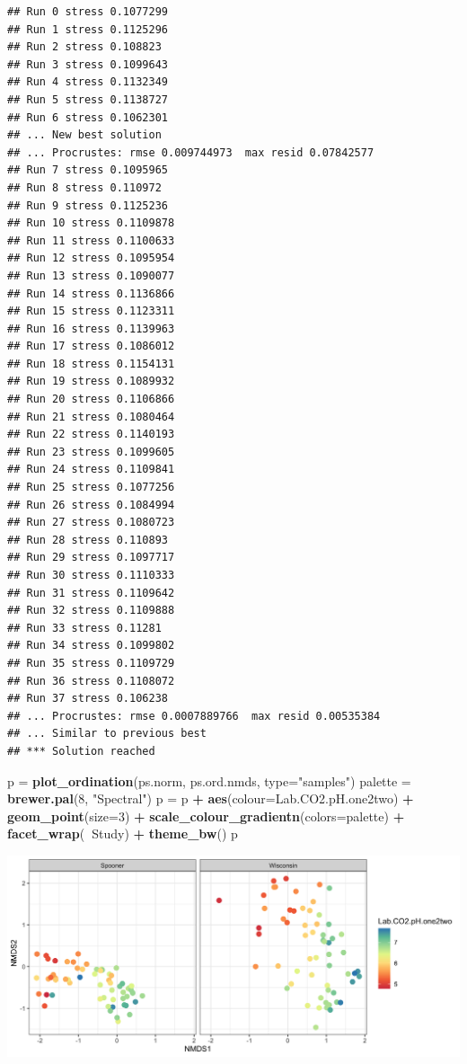 \documentclass[]{article}
\newenvironment{Shaded}{\begin{snugshade}}{\end{snugshade}}
\newcommand{\DataTypeTok}[1]{\textcolor[rgb]{0.13,0.29,0.53}{#1}}
\newcommand{\DecValTok}[1]{\textcolor[rgb]{0.00,0.00,0.81}{#1}}
\newcommand{\KeywordTok}[1]{\textcolor[rgb]{0.13,0.29,0.53}{\textbf{#1}}}
\newcommand{\NormalTok}[1]{#1}
\newcommand{\OperatorTok}[1]{\textcolor[rgb]{0.81,0.36,0.00}{\textbf{#1}}}
\newcommand{\StringTok}[1]{\textcolor[rgb]{0.31,0.60,0.02}{#1}}
\begin{document}
\begin{verbatim}
## Run 0 stress 0.1077299 
## Run 1 stress 0.1125296 
## Run 2 stress 0.108823 
## Run 3 stress 0.1099643 
## Run 4 stress 0.1132349 
## Run 5 stress 0.1138727 
## Run 6 stress 0.1062301 
## ... New best solution
## ... Procrustes: rmse 0.009744973  max resid 0.07842577 
## Run 7 stress 0.1095965 
## Run 8 stress 0.110972 
## Run 9 stress 0.1125236 
## Run 10 stress 0.1109878 
## Run 11 stress 0.1100633 
## Run 12 stress 0.1095954 
## Run 13 stress 0.1090077 
## Run 14 stress 0.1136866 
## Run 15 stress 0.1123311 
## Run 16 stress 0.1139963 
## Run 17 stress 0.1086012 
## Run 18 stress 0.1154131 
## Run 19 stress 0.1089932 
## Run 20 stress 0.1106866 
## Run 21 stress 0.1080464 
## Run 22 stress 0.1140193 
## Run 23 stress 0.1099605 
## Run 24 stress 0.1109841 
## Run 25 stress 0.1077256 
## Run 26 stress 0.1084994 
## Run 27 stress 0.1080723 
## Run 28 stress 0.110893 
## Run 29 stress 0.1097717 
## Run 30 stress 0.1110333 
## Run 31 stress 0.1109642 
## Run 32 stress 0.1109888 
## Run 33 stress 0.11281 
## Run 34 stress 0.1099802 
## Run 35 stress 0.1109729 
## Run 36 stress 0.1108072 
## Run 37 stress 0.106238 
## ... Procrustes: rmse 0.0007889766  max resid 0.00535384 
## ... Similar to previous best
## *** Solution reached
\end{verbatim}

\begin{Shaded}
\begin{Highlighting}[]
\NormalTok{p =}\StringTok{ }\KeywordTok{plot_ordination}\NormalTok{(ps.norm, ps.ord.nmds, }\DataTypeTok{type=}\StringTok{"samples"}\NormalTok{)}
\NormalTok{palette =}\StringTok{ }\KeywordTok{brewer.pal}\NormalTok{(}\DecValTok{8}\NormalTok{, }\StringTok{"Spectral"}\NormalTok{)}
\NormalTok{p =}\StringTok{ }\NormalTok{p }\OperatorTok{+}\StringTok{ }\KeywordTok{aes}\NormalTok{(}\DataTypeTok{colour=}\NormalTok{Lab.CO2.pH.one2two) }\OperatorTok{+}\StringTok{ }\KeywordTok{geom_point}\NormalTok{(}\DataTypeTok{size=}\DecValTok{3}\NormalTok{) }\OperatorTok{+}\StringTok{ }
\StringTok{  }\KeywordTok{scale_colour_gradientn}\NormalTok{(}\DataTypeTok{colors=}\NormalTok{palette) }\OperatorTok{+}\StringTok{ }\KeywordTok{facet_wrap}\NormalTok{(}\OperatorTok{~}\NormalTok{Study) }\OperatorTok{+}\StringTok{ }
\StringTok{  }\KeywordTok{theme_bw}\NormalTok{()}
\NormalTok{p}
\end{Highlighting}
\end{Shaded}

\includegraphics{output-rmd/nmds-bray-soilph-Lab.CO2.pH.one2two-1.png}
\end{document}
